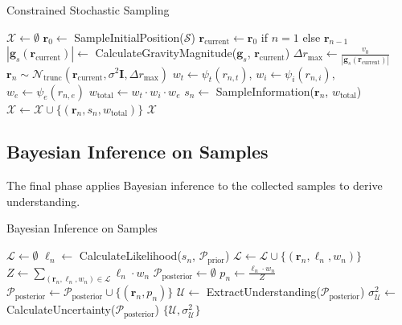 \documentclass[12pt,a4paper]{article}
\begin{document}
\begin{algorithm}[H]
\caption{Constrained Stochastic Sampling}
\begin{algorithmic}[1]
    \State $\mathcal{X} \leftarrow \emptyset$ 
    \State $\mathbf{r}_0 \leftarrow$ SampleInitialPosition($\mathcal{S}$)
        \State $\mathbf{r}_{\text{current}} \leftarrow \mathbf{r}_0$ if $n = 1$ else $\mathbf{r}_{n-1}$
        \State $|\mathbf{g}_s(\mathbf{r}_{\text{current}})| \leftarrow$ CalculateGravityMagnitude($\mathbf{g}_s$, $\mathbf{r}_{\text{current}}$)
        \State $\Delta r_{\max} \leftarrow \frac{v_0}{|\mathbf{g}_s(\mathbf{r}_{\text{current}})|}$
        \State $\mathbf{r}_n \sim \mathcal{N}_{\text{trunc}}(\mathbf{r}_{\text{current}}, \sigma^2 \mathbf{I}, \Delta r_{\max})$
        \State $w_t \leftarrow \psi_t(r_{n,t})$, $w_i \leftarrow \psi_i(r_{n,i})$, $w_e \leftarrow \psi_e(r_{n,e})$
        \State $w_{\text{total}} \leftarrow w_t \cdot w_i \cdot w_e$
        \State $s_n \leftarrow$ SampleInformation($\mathbf{r}_n$, $w_{\text{total}}$)
        \State $\mathcal{X} \leftarrow \mathcal{X} \cup \{(\mathbf{r}_n, s_n, w_{\text{total}})\}$
    \EndFor
    \State \Return $\mathcal{X}$
\EndProcedure
\end{algorithmic}
\end{algorithm}

\subsection{Bayesian Inference on Samples}

The final phase applies Bayesian inference to the collected samples to derive understanding.

\begin{algorithm}[H]
\caption{Bayesian Inference on Samples}
\begin{algorithmic}[1]
    \State $\mathcal{L} \leftarrow \emptyset$ 
        \State $\ell_n \leftarrow$ CalculateLikelihood($s_n$, $\mathcal{P}_{\text{prior}}$)
        \State $\mathcal{L} \leftarrow \mathcal{L} \cup \{(\mathbf{r}_n, \ell_n, w_n)\}$
    \EndFor
    \State $Z \leftarrow \sum_{(\mathbf{r}_n, \ell_n, w_n) \in \mathcal{L}} \ell_n \cdot w_n$ 
    \State $\mathcal{P}_{\text{posterior}} \leftarrow \emptyset$
        \State $p_n \leftarrow \frac{\ell_n \cdot w_n}{Z}$
        \State $\mathcal{P}_{\text{posterior}} \leftarrow \mathcal{P}_{\text{posterior}} \cup \{(\mathbf{r}_n, p_n)\}$
    \EndFor
    \State $\mathcal{U} \leftarrow$ ExtractUnderstanding($\mathcal{P}_{\text{posterior}}$)
    \State $\sigma_{\mathcal{U}}^2 \leftarrow$ CalculateUncertainty($\mathcal{P}_{\text{posterior}}$)
    \State \Return $\{\mathcal{U}, \sigma_{\mathcal{U}}^2\}$
\EndProcedure
\end{algorithmic}
\end{algorithm}
\end{document}
